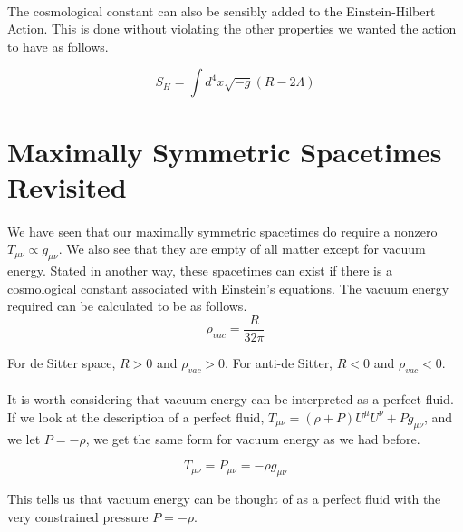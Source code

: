 \documentclass[10pt]{article}
\begin{document}
    \paragraph{}The cosmological constant can also be sensibly added to the Einstein-Hilbert Action. This is done without violating the other properties we wanted the action to have as follows.
    
    \begin{equation}
        {S}_{H} = \int {d}^{4}x \sqrt{-g}(R-2\Lambda)
    \end{equation}
    
    \section{Maximally Symmetric Spacetimes Revisited} 
    \paragraph{} We have seen that our maximally symmetric spacetimes do require a nonzero ${T}_{\mu\nu} \propto {g}_{\mu\nu}$. We also see that they are empty of all matter except for vacuum energy. Stated in another way, these spacetimes can exist if there is a cosmological constant associated with Einstein's equations. The vacuum energy required can be calculated to be as follows.
    \begin{equation}
        {\rho}_{vac} = \frac{R}{32\pi}
    \end{equation}
    
    \noindent For de Sitter space, $R > 0$ and ${\rho}_{vac} > 0$. For anti-de Sitter, $R < 0$ and ${\rho}_{vac} < 0$. 
    
    \paragraph{} It is worth considering that vacuum energy can be interpreted as a perfect fluid. If we look at the description of a perfect fluid, ${T}_{\mu\nu} = (\rho + P){U}^{\mu}{U}^{\nu} + P{g}_{\mu\nu}$, and we let $P=-\rho$, we get the same form for vacuum energy as we had before.
    
    \begin{equation}
        {T}_{\mu\nu} = {P}_{\mu\nu} = -\rho{g}_{\mu\nu}
    \end{equation}
    
    \noindent This tells us that vacuum energy can be thought of as a perfect fluid with the very constrained pressure $P=-\rho$. 
    
\end{document}
